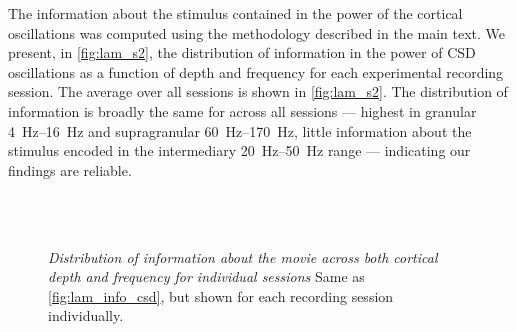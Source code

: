 The information about the stimulus contained in the power of the cortical oscillations was computed using the methodology described in the main text.
We present, in \autoref{fig:lam_s2}, the distribution of information in the power of \ac{CSD} oscillations as a function of depth and frequency for each experimental recording session.
The average over all sessions is shown in \autoref{fig:lam_s2}.
The distribution of information is broadly the same for across all sessions --- highest in granular \SIrange{4}{16}{Hz} and supragranular \SIrange{60}{170}{Hz}, little information about the stimulus encoded in the intermediary \SIrange{20}{50}{Hz} range --- indicating our findings are reliable.


\begin{figure}
    \centering
    \hspace*{\fill}
    \hspace*{\fill}\hspace{.2cm}\hspace*{\fill}
    \hspace*{\fill}
    \\
    \hspace*{\fill}
    \hspace*{\fill}\hspace{.2cm}\hspace*{\fill}
    \hspace*{\fill}
    \\
    \hspace*{\fill}
    \hspace*{\fill}\hspace{.2cm}\hspace*{\fill}
    \hspace*{\fill}
%
\caption{%
\textit{Distribution of information about the movie across both cortical depth and frequency for individual sessions}
Same as \autoref{fig:lam_info_csd}, but shown for each recording session individually.
}
\label{fig:lam_s2}
%
\end{figure}


